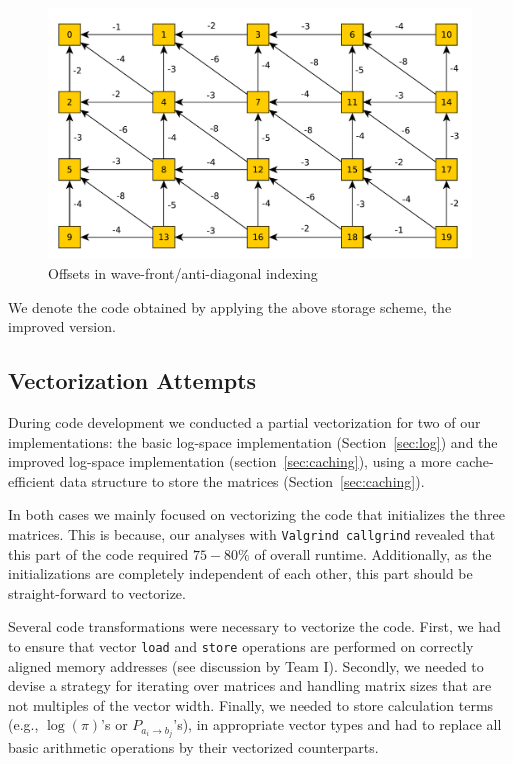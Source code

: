 \documentclass[runningheads,a4paper]{llncs}
\begin{document}
\begin{figure}
\centering
\includegraphics[scale=0.5]{images/unnamed0.pdf}
\caption{Offsets in wave-front/anti-diagonal indexing}
\label{fig:offset}
\end{figure}


We denote the code obtained by applying the above storage scheme, the improved version.

\subsection{Vectorization Attempts}
\label{sec:vector}
During code development we conducted a partial vectorization for two of our implementations: 
the basic log-space implementation (Section~\ref{sec:log}) and the improved log-space implementation (section~\ref{sec:caching}), using a more 
cache-efficient data structure to store the matrices (Section~\ref{sec:caching}).

In both cases we mainly focused on vectorizing the code that initializes the three matrices. 
This is because, our analyses with \texttt{Valgrind callgrind} revealed that this 
part of the code required $75-80\%$ of overall runtime. 
Additionally, as the initializations are completely independent of each other, this part should be straight-forward to vectorize.

Several code transformations were necessary to vectorize the code. 
First, we had to ensure that vector \texttt{load} and \texttt{store} operations are performed on correctly aligned memory addresses (see discussion by Team I). 
Secondly, we needed to devise a strategy for iterating over matrices and handling matrix sizes that are not multiples of the vector width.
Finally, we needed to store calculation terms (e.g., $\log(\pi)$'s or $P_{a_i \to b_j}$'s), in appropriate vector types and 
had to replace all basic arithmetic operations by their vectorized counterparts.
\end{document}
